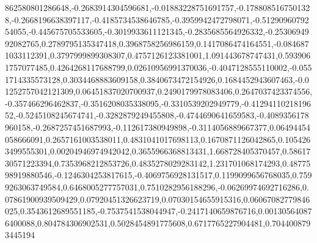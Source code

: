 862580801286648,-0.2683914304596681,-0.01883228751691757,-0.1788085167501328,-0.2668196638397117,-0.4185734538646785,-0.3959942472798071,-0.5129096079254055,-0.445675705533605,-0.3019933611121345,-0.2835685564926332,-0.2530694992082765,0.2789795135347418,0.3968758256986159,0.1417086474164551,-0.0846871033112391,0.3797999899308307,0.4757126123381001,1.091443678747431,0.5939061757077485,0.4264268117688799,0.02610956991370036,-0.4047128555110002,-0.0551714335573128,0.3034468883609158,0.3840673472154926,0.1684452943607463,-0.01252757042121309,0.06451837020700937,0.2490179978083406,0.2647037423374556,-0.357466296462837,-0.3516208035338095,-0.3310539202949779,-0.4129411021819652,-0.5245108245674741,-0.3282879249455808,-0.4744690641659583,-0.4089356178960158,-0.2687257451687993,-0.112617380949898,-0.3114056889667377,0.06494454058666091,0.2657161003538011,0.4831041017698113,0.1670871126042865,0.1054263499555301,0.00204946974942042,0.3655966368813431,1.668728405370457,0.5861730571223394,0.7353968212853726,0.4835278029283142,1.231701068174293,0.4877598919880546,-0.1246304253817615,-0.4069756928131517,0.1199099656768035,0.7599263063749584,0.6468005277757031,0.7510282956188296,-0.06269974692716286,0.07861900939509429,0.07920451326623719,0.07030154655915316,0.06067082779846025,0.3543612689551185,-0.7537541538044947,-0.2417140659876716,0.001305640876400088,0.804784306902531,0.5028454891775608,0.6717765227904481,0.7044008793445194
